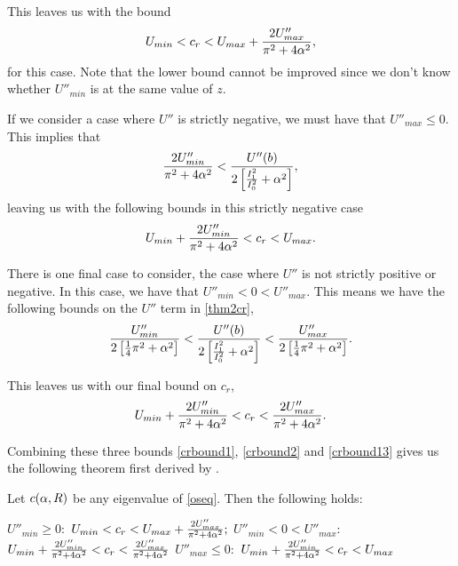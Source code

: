 This leaves us with the bound 
\begin{equation}
    U_{min} < c_r < U_{max} + \frac{2 U''_{max}}{\pi^2 + 4 \alpha^2}, \label{crbound1}
\end{equation}
for this case. Note that the lower bound cannot be improved since we don't know whether $ U''_{min}$ is at the same value of $z$. 

If we consider a case where $ U'' $ is strictly negative, we must have that $ U''_{max} \leq 0 $. This implies that  
\begin{equation}
    \frac{2 U''_{min}}{\pi^2 + 4 \alpha^2} < \frac{U''(b)}{2 \left[\tfrac{I^2_{1}}{I^2_{0}} + \alpha^2\right]},
\end{equation}
leaving us with the following bounds in this strictly negative case
\begin{equation}
     U_{min} + \frac{2 U''_{min}}{\pi^2 + 4 \alpha^2} < c_r < U_{max}. \label{crbound2}
\end{equation}

There is one final case to consider, the case where $ U''$ is not strictly positive or negative. In this case, we have that $ U''_{min} < 0 < U''_{max} $. This means we have the following bounds on the $ U'' $ term in \eqref{thm2cr}, 
\begin{equation}
    \frac{U''_{min}}{2 \left[\tfrac{1}{4} \pi^2 + \alpha^2\right]} < \frac{U''(b)}{2 \left[\tfrac{I^2_{1}}{I^2_{0}} + \alpha^2\right]} < \frac{U''_{max}}{2 \left[\tfrac{1}{4} \pi^2 + \alpha^2\right]}. 
\end{equation}

This leaves us with our final bound on $ c_r$,
\begin{equation}
    U_{min} + \frac{2 U''_{min}}{\pi^2 + 4 \alpha^2}< c_r < \frac{2 U''_{max}}{\pi^2 + 4 \alpha^2}. \label{crbound13}
\end{equation}

Combining these three bounds \eqref{crbound1}, \eqref{crbound2} and \eqref{crbound13} gives us the following theorem first derived by \citet{joseph1969eigenvalue}.

\begin{theorem} 
Let $c(\alpha, R)$ be any eigenvalue of \eqref{oseq}. Then the following holds:
\begin{outline}
    \1 $ U''_{min} \geq 0: $
        \2 $ U_{min} < c_r < U_{max} + \frac{2 U''_{max}}{\pi^2 + 4 \alpha^2}; $
    \1 $ U''_{min} < 0 < U''_{max}: $
        \2 $ U_{min} + \frac{2 U''_{min}}{\pi^2 + 4 \alpha^2} < c_r < \frac{2 U''_{max}}{\pi^2 + 4 \alpha^2} $
    \1 $ U''_{max} \leq 0: $
        \2 $ U_{min} + \frac{2 U''_{min}}{\pi^2 + 4 \alpha^2} < c_r < U_{max} $
\end{outline}
\end{theorem}

